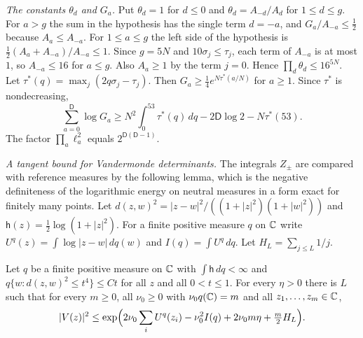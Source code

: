 \emph{The constants $\theta_d$ and $G_a$.} Put $\theta_d=1$ for $d\le0$ and $\theta_d=A_{-d}/A_d$ for $1\le d\le g$. For $a>g$ the
sum in the hypothesis has the single term $d=-a$, and $G_a/A_{-a}\le\frac12$ because $A_a\le A_{-a}$. For $1\le a\le g$
the left side of the hypothesis is $\frac12(A_a+A_{-a})/A_{-a}\le1$. Since $g=5N$ and $10\sigma_j\le\tau_j$, each term of $A_{-a}$ is at
most $1$, so $A_{-a}\le16$ for $a\le g$. Also $A_a\ge1$ by the term $j=0$. Hence $\prod_d\theta_d\le16^{5N}$. Let
$\tau^*(q)=\max_j(2q\sigma_j-\tau_j)$. Then $G_a\ge\frac14e^{N\tau^*(a/N)}$ for $a\ge1$. Since $\tau^*$ is nondecreasing,
\begin{equation}\label{eq:legendre}
 \sum_{a=0}^{\mathsf D}\log G_a\ge N^2\int_0^{53}\tau^*(q)\,dq-2\mathsf D\log2-N\tau^*(53).
\end{equation}
The factor $\prod_a\ell_a^2$ equals $2^{\mathsf D(\mathsf D-1)}$.

\emph{A tangent bound for Vandermonde determinants.} The integrals $Z_\pm$ are compared with reference measures by the
following lemma, which is the negative definiteness of the logarithmic energy on neutral measures in a form exact
for finitely many points. Let $d(z,w)^2=|z-w|^2/((1+|z|^2)(1+|w|^2))$ and $\mathsf h(z)=\frac12\log(1+|z|^2)$. For a finite positive measure $q$ on
$\mathbb C$ write $U^q(z)=\int\log|z-w|\,dq(w)$ and $I(q)=\int U^q\,dq$. Let $H_L=\sum_{j\le L}1/j$.

\begin{lemma}\label{lem:tangent}
Let $q$ be a finite positive measure on $\mathbb C$ with $\int\mathsf h\,dq<\infty$ and $q\{w:d(z,w)^2\le t^4\}\le Ct$ for all $z$ and all
$0<t\le1$. For every $\eta>0$ there is $L$ such that for every $m\ge0$, all $\nu_0\ge0$ with $\nu_0q(\mathbb C)=m$ and all
$z_1,\ldots,z_m\in\mathbb C$,
\[
 |V(z)|^2\le\exp\Bigl(2\nu_0\sum_iU^q(z_i)-\nu_0^2I(q)+2\nu_0m\eta+\tfrac m2H_L\Bigr).
\]
\end{lemma}

